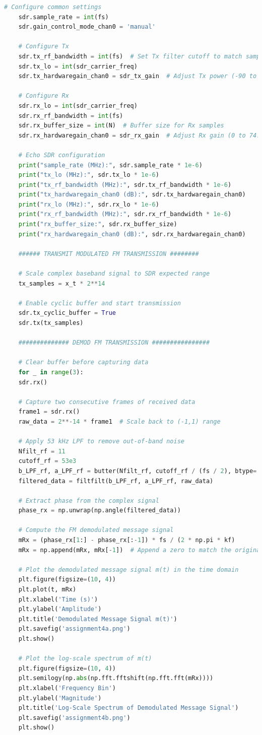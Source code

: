 \documentclass[
	letterpaper, %
	10pt, %
]{CSUniSchoolLabReport}
\begin{document}
\begin{lstlisting}[language=Python]
	# Configure common settings
	sdr.sample_rate = int(fs)
	sdr.gain_control_mode_chan0 = 'manual'
	
	# Configure Tx
	sdr.tx_rf_bandwidth = int(fs)  # Set Tx filter cutoff to match sample rate
	sdr.tx_lo = int(sdr_carrier_freq)
	sdr.tx_hardwaregain_chan0 = sdr_tx_gain  # Adjust Tx power (-90 to 0 dB)
	
	# Configure Rx
	sdr.rx_lo = int(sdr_carrier_freq)
	sdr.rx_rf_bandwidth = int(fs)
	sdr.rx_buffer_size = int(N)  # Buffer size for Rx samples
	sdr.rx_hardwaregain_chan0 = sdr_rx_gain  # Adjust Rx gain (0 to 74.5 dB)
	
	# Echo SDR configuration
	print("sample_rate (MHz):", sdr.sample_rate * 1e-6)
	print("tx_lo (MHz):", sdr.tx_lo * 1e-6)
	print("tx_rf_bandwidth (MHz):", sdr.tx_rf_bandwidth * 1e-6)
	print("tx_hardwaregain_chan0 (dB):", sdr.tx_hardwaregain_chan0)
	print("rx_lo (MHz):", sdr.rx_lo * 1e-6)
	print("rx_rf_bandwidth (MHz):", sdr.rx_rf_bandwidth * 1e-6)
	print("rx_buffer_size:", sdr.rx_buffer_size)
	print("rx_hardwaregain_chan0 (dB):", sdr.rx_hardwaregain_chan0)
	
	###### TRANSMIT MODULATED FM TRANSMISSION ########
	
	# Scale complex baseband signal to SDR expected range
	tx_samples = x_t * 2**14  
	
	# Enable cyclic buffer and start transmission
	sdr.tx_cyclic_buffer = True
	sdr.tx(tx_samples)
	
	############## DEMOD FM TRANSMISSION ################
	
	# Clear buffer before capturing data
	for _ in range(3):
	sdr.rx()
	
	# Capture two consecutive frames of received data
	frame1 = sdr.rx()
	raw_data = 2**-14 * frame1  # Scale back to (-1,1) range
	
	# Apply 53 kHz LPF to remove out-of-band noise
	Nfilt_rf = 11
	cutoff_rf = 53e3
	b_LPF_rf, a_LPF_rf = butter(Nfilt_rf, cutoff_rf / (fs / 2), btype='low')
	filtered_data = filtfilt(b_LPF_rf, a_LPF_rf, raw_data)
	
	# Extract phase from the complex signal
	phase_rx = np.unwrap(np.angle(filtered_data))
	
	# Compute the FM demodulated message signal
	mRx = (phase_rx[1:] - phase_rx[:-1]) * fs / (2 * np.pi * kf)
	mRx = np.append(mRx, mRx[-1])  # Append a zero to match the original length
	
	# Plot the demodulated message signal m(t) in the time domain
	plt.figure(figsize=(10, 4))
	plt.plot(t, mRx)
	plt.xlabel('Time (s)')
	plt.ylabel('Amplitude')
	plt.title('Demodulated Message Signal m(t)')
	plt.savefig('assignment4a.png')
	plt.show()
	
	# Plot the log-scale spectrum of m(t)
	plt.figure(figsize=(10, 4))
	plt.semilogy(np.abs(np.fft.fftshift(np.fft.fft(mRx))))
	plt.xlabel('Frequency Bin')
	plt.ylabel('Magnitude')
	plt.title('Log-Scale Spectrum of Demodulated Message Signal')
	plt.savefig('assignment4b.png')
	plt.show()
	
\end{lstlisting}
\end{document}
